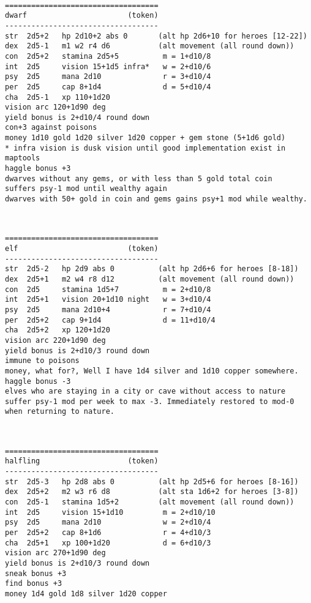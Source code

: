\

\goodbreak \begin{samepage} \begin{verbatim}
===================================
dwarf                       (token)
-----------------------------------
str  2d5+2   hp 2d10+2 abs 0       (alt hp 2d6+10 for heroes [12-22])
dex  2d5-1   m1 w2 r4 d6           (alt movement (all round down))
con  2d5+2   stamina 2d5+5          m = 1+d10/8
int  2d5     vision 15+1d5 infra*   w = 2+d10/6
psy  2d5     mana 2d10              r = 3+d10/4
per  2d5     cap 8+1d4              d = 5+d10/4
cha  2d5-1   xp 110+1d20
vision arc 120+1d90 deg
yield bonus is 2+d10/4 round down
con+3 against poisons
money 1d10 gold 1d20 silver 1d20 copper + gem stone (5+1d6 gold)
* infra vision is dusk vision until good implementation exist in maptools
haggle bonus +3
dwarves without any gems, or with less than 5 gold total coin
suffers psy-1 mod until wealthy again
dwarves with 50+ gold in coin and gems gains psy+1 mod while wealthy.
\end{verbatim} \end{samepage}

\

\goodbreak \begin{samepage} \begin{verbatim}
===================================
elf                         (token)
-----------------------------------
str  2d5-2   hp 2d9 abs 0          (alt hp 2d6+6 for heroes [8-18])
dex  2d5+1   m2 w4 r8 d12          (alt movement (all round down))
con  2d5     stamina 1d5+7          m = 2+d10/8
int  2d5+1   vision 20+1d10 night   w = 3+d10/4
psy  2d5     mana 2d10+4            r = 7+d10/4
per  2d5+2   cap 9+1d4              d = 11+d10/4
cha  2d5+2   xp 120+1d20
vision arc 220+1d90 deg
yield bonus is 2+d10/3 round down
immune to poisons
money, what for?, Well I have 1d4 silver and 1d10 copper somewhere.
haggle bonus -3
elves who are staying in a city or cave without access to nature
suffer psy-1 mod per week to max -3. Immediately restored to mod-0
when returning to nature.
\end{verbatim} \end{samepage}

\

\goodbreak \begin{samepage} \begin{verbatim}
===================================
halfling                    (token)
-----------------------------------
str  2d5-3   hp 2d8 abs 0          (alt hp 2d5+6 for heroes [8-16])
dex  2d5+2   m2 w3 r6 d8           (alt sta 1d6+2 for heroes [3-8])
con  2d5-1   stamina 1d5+2         (alt movement (all round down))
int  2d5     vision 15+1d10         m = 2+d10/10
psy  2d5     mana 2d10              w = 2+d10/4
per  2d5+2   cap 8+1d6              r = 4+d10/3
cha  2d5+1   xp 100+1d20            d = 6+d10/3
vision arc 270+1d90 deg
yield bonus is 2+d10/3 round down
sneak bonus +3
find bonus +3
money 1d4 gold 1d8 silver 1d20 copper
\end{verbatim} \end{samepage}

